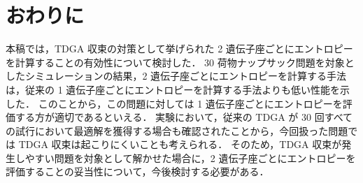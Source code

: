 \documentclass[dvipdfmx,autodetect-engine]{ujarticle}
\begin{document}
\section{おわりに}
本稿では，TDGA 収束の対策として挙げられた 2 遺伝子座ごとにエントロピーを計算することの有効性について検討した．
30 荷物ナップサック問題を対象としたシミュレーションの結果，2 遺伝子座ごとにエントロピーを計算する手法は，従来の 1 遺伝子座ごとにエントロピーを計算する手法よりも低い性能を示した．
このことから，この問題に対しては 1 遺伝子座ごとにエントロピーを評価する方が適切であるといえる．
実験において，従来の TDGA が 30 回すべての試行において最適解を獲得する場合も確認されたことから，今回扱った問題では TDGA 収束は起こりにくいことも考えられる．
そのため，TDGA 収束が発生しやすい問題を対象として解かせた場合に，2 遺伝子座ごとにエントロピーを評価することの妥当性について，今後検討する必要がある．



\end{document}
